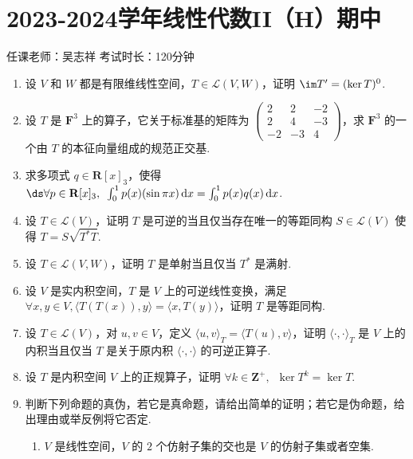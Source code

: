 \section{2023-2024学年线性代数II（H）期中}

\begin{center}
    任课老师：吴志祥\hspace{4em} 考试时长：120分钟
\end{center}

\begin{enumerate}
    \item 设 $V$ 和 $W$ 都是有限维线性空间，$T \in \mathcal{L}(V, W)$，证明 $\im T' = (\ker T)^{0}$.

    \item 设 $T$ 是 $\mathbf{F}^3$ 上的算子，它关于标准基的矩阵为 $\begin{pmatrix}
        2 & 2 & -2 \\ 2 & 4 & -3 \\ -2 & -3 & 4
    \end{pmatrix}$，求 $\mathbf{F}^3$ 的一个由 $T$ 的本征向量组成的规范正交基.

	\item 求多项式 $q \in \mathbf{R}[x]_3$，使得 $\ds\forall p \in \mathbf{R}[x]_3,\enspace \int_{0}^{1}p(x)(\sin \pi x)\,\mathrm{d}x = \int_{0}^{1}p(x)q(x)\,\mathrm{d}x$.

	\item 设 $T \in \mathcal{L}(V)$，证明 $T$ 是可逆的当且仅当存在唯一的等距同构 $S \in \mathcal{L}(V)$ 使得 $T = S \sqrt{T^{*}T}$.

    \item 设 $T \in \mathcal{L}(V, W)$，证明 $T$ 是单射当且仅当 $T^{*}$ 是满射.

    \item 设 $V$ 是实内积空间，$T$ 是 $V$ 上的可逆线性变换，满足 $\forall x, y \in V, \langle T(T(x)), y \rangle = \langle x, T(y) \rangle$，证明 $T$ 是等距同构.

    \item 设 $T \in \mathcal{L}(V)$，对 $u, v \in V$，定义 $\langle u, v \rangle_{T} = \langle T(u), v \rangle$，证明 $\langle \cdot, \cdot \rangle_{T}$ 是 $V$ 上的内积当且仅当 $T$ 是关于原内积 $\langle \cdot, \cdot \rangle$ 的可逆正算子.

    \item 设 $T$ 是内积空间 $V$ 上的正规算子，证明 $\forall k \in \mathbf{Z}^{+},\enspace \ker T^{k} = \ker T$.

    \item 判断下列命题的真伪，若它是真命题，请给出简单的证明；若它是伪命题，给出理由或举反例将它否定.
    \begin{enumerate}
        \item $V$ 是线性空间，$V$ 的 $2$ 个仿射子集的交也是 $V$ 的仿射子集或者空集.


\end{enumerate}
\end{enumerate}
